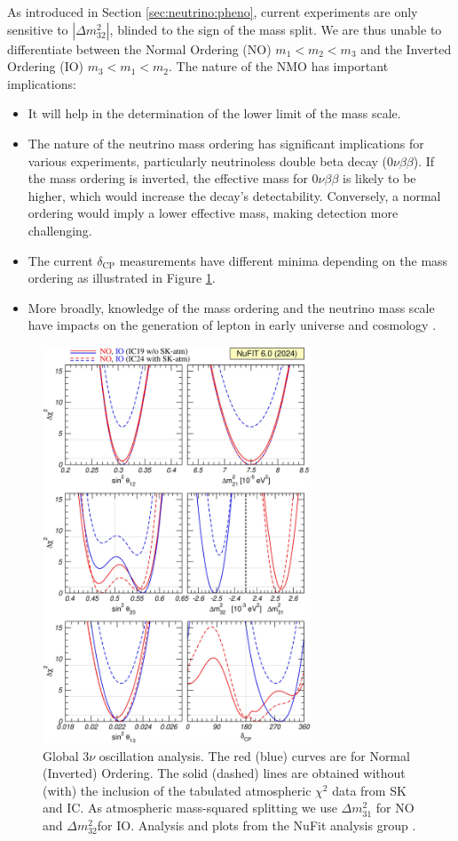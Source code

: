 \documentclass[../main.tex]{subfiles}
\begin{document}
As introduced in Section \ref{sec:neutrino:pheno}, current experiments are only sensitive to $|\Delta m^2_{32}|$, blinded to the sign of the mass split. We are thus unable to differentiate between the Normal Ordering (NO) $m_1 < m_2 < m_3$ and the Inverted Ordering (IO) $m_3 < m_1 < m_2$. The nature of the NMO has important implications:
\begin{itemize}
  \item It will help in the determination of the lower limit of the mass scale.
  \item The nature of the neutrino mass ordering has significant implications for various experiments, particularly neutrinoless double beta decay ($0\nu\beta\beta$). If the mass ordering is inverted, the effective mass for $0\nu\beta\beta$ is likely to be higher, which would increase the decay's detectability. Conversely, a normal ordering would imply a lower effective mass, making detection more challenging.
  \item The current $\delta_{\text{CP}}$ measurements have different minima depending on the mass ordering as illustrated in Figure \ref{fig:neutrino:chi2_proj}.
  \item More broadly, knowledge of the mass ordering and the neutrino mass scale have impacts on the generation of lepton in early universe and cosmology \cite{hannestad_cosmology_2016}.
\end{itemize}

\begin{figure}[ht]
  \centering
  \includegraphics[width=8cm]{images/neutrinos/chi2_proj.jpg}
  \caption{Global 3$\nu$ oscillation analysis. The red (blue) curves are for Normal (Inverted) Ordering. The solid (dashed) lines are obtained without (with) the inclusion of the tabulated atmospheric $\chi^2$ data from SK and IC. As atmospheric mass-squared splitting we use $\Delta m^2_{31}$ for NO and $\Delta m^2_{32}$for IO. Analysis and plots from the NuFit analysis group \cite{esteban_nufit-60_2024, noauthor_nufit_nodate}.}
  \label{fig:neutrino:chi2_proj}
\end{figure}
\end{document}
